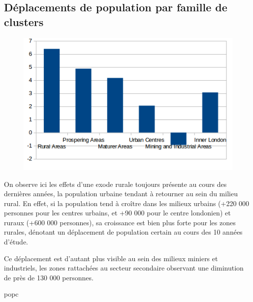 \pagebreak


\subsection{Déplacements de population par famille de clusters}

\begin{figure}[h!]
    \centering
    \includegraphics[width=\linewidth]{images/pop/deltaPopFamilleCluster.png}
\end{figure}

On observe ici les effets d'une exode rurale toujours présente au cours des dernières années, la population urbaine tendant à retourner au sein du milieu rural. En effet, si la population tend à croître dans les milieux urbains (+220 000 personnes pour les centres urbains, et +90 000 pour le centre londonien) et ruraux (+600 000 personnes), sa croissance est bien plus forte pour les zones rurales, dénotant un déplacement de population certain au cours des 10 années d'étude.

Ce déplacement est d'autant plus visible au sein des milieux miniers et industriels, les zones rattachées au secteur secondaire observant une diminution de près de 130 000 personnes.
\pagebreak

popc